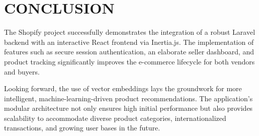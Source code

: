 \chapter{CONCLUSION}

The Shopify project successfully demonstrates the integration of a robust Laravel backend with an interactive React frontend via Inertia.js. The implementation of features such as secure session authentication, an elaborate seller dashboard, and product tracking significantly improves the e-commerce lifecycle for both vendors and buyers. 

Looking forward, the use of vector embeddings lays the groundwork for more intelligent, machine-learning-driven product recommendations. The application's modular architecture not only ensures high initial performance but also provides scalability to accommodate diverse product categories, internationalized transactions, and growing user bases in the future.
